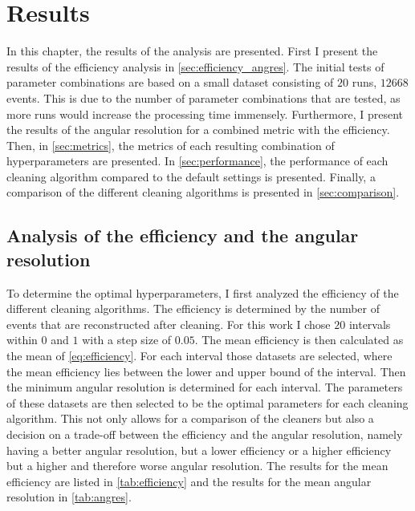 \chapter{Results}
\label{ch:results}

In this chapter, the results of the analysis are presented. First I present the results of the
efficiency analysis in \autoref{sec:efficiency_angres}. The initial tests of parameter combinations
are based on a small dataset consisting of \(\num{20}\) runs, \ie{} \(\num{12668}\) events. This is
due to the number of parameter combinations that are tested, as more runs would increase the
processing time immensely. Furthermore, I present the results of the angular resolution for a combined
metric with the efficiency. Then, in \autoref{sec:metrics}, the metrics of each resulting combination
of hyperparameters are presented. In \autoref{sec:performance}, the performance of each cleaning
algorithm compared to the default settings is presented. Finally, a comparison of the different
cleaning algorithms is presented in \autoref{sec:comparison}.


\section{Analysis of the efficiency and the angular resolution}
\label{sec:efficiency_angres}

To determine the optimal hyperparameters, I first analyzed the efficiency of the different cleaning algorithms.
The efficiency is determined by the number of events that are reconstructed after cleaning. For this work
I chose \(\num{20}\) intervals within \(\num{0}\) and \(\num{1}\) with a step size of \(\num{0.05}\).
The mean efficiency is then calculated as the mean of \autoref{eq:efficiency}.
For each interval those datasets are selected, where the mean efficiency lies between the lower and upper
bound of the interval. Then the minimum angular resolution is determined for each interval. The parameters
of these datasets are then selected to be the optimal parameters for each cleaning algorithm. This not
only allows for a comparison of the cleaners but also a decision on a trade-off between the efficiency
and the angular resolution, namely having a better angular resolution, but a lower efficiency or
a higher efficiency but a higher and therefore worse angular resolution.
The results for the mean efficiency are listed in \autoref{tab:efficiency} and
the results for the mean angular resolution in \autoref{tab:angres}.


